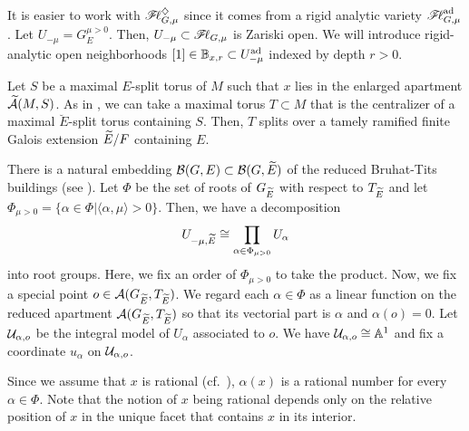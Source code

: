\documentclass[12pt,reqno]{amsart}
\begin{document}
It is easier to work with ${\mathscr{F}\!\ell}_{G, \mu}^\diamondsuit$ since it comes from a rigid analytic variety ${\mathscr{F}\!\ell}_{G, \mu}^{\operatorname{ad}}$. %
Let $U_{-\mu} = G_E^{\mu > 0}$. Then, $U_{-\mu} \subset {\mathscr{F}\!\ell}_{G, \mu}$ is Zariski open. We will introduce rigid-analytic open neighborhoods $[1] \in \mathbb{B}_{x, r} \subset U_{-\mu}^{\operatorname{ad}}$ indexed by depth $r > 0$.

Let $S$ be a maximal $E$-split torus of $M$ such that $x$ lies in the enlarged apartment ${\widetilde{{\mathcal{A}}}}(M, S)$. As in \cite[Section 2]{Yu01}, we can take a maximal torus $T \subset M$ that is the centralizer of a maximal $\breve{E}$-split torus containing $S$. Then, $T$ splits over a tamely ramified finite Galois extension ${\widetilde{E}} / F$ containing $E$. 

There is a natural embedding ${\mathcal{B}}(G, E) \subset {\mathcal{B}}(G, {\widetilde{E}})$ of the reduced Bruhat-Tits buildings (see \cite[Section 12.9]{KP23}). Let $\Phi$ be the set of roots of $G_{{\widetilde{E}}}$ with respect to $T_{{\widetilde{E}}}$ and let $\Phi_{\mu > 0} = \{ \alpha \in \Phi \vert \langle \alpha, \mu \rangle > 0 \}$. Then, we have a decomposition 
\begin{equation} \label{eq:product_description}
    U_{-\mu, {\widetilde{E}}} \cong \prod_{\alpha \in \Phi_{\mu > 0}} U_{\alpha}
\end{equation}
into root groups. Here, we fix an order of $\Phi_{\mu > 0}$ to take the product. Now, we fix a special point $o \in {\mathcal{A}}(G_{{\widetilde{E}}}, T_{{\widetilde{E}}})$. We regard each $\alpha \in \Phi$ as a linear function on the reduced apartment ${\mathcal{A}}(G_{{\widetilde{E}}}, T_{{\widetilde{E}}})$ so that its vectorial part is $\alpha$ and $\alpha(o) = 0$. Let ${\mathcal{U}}_{\alpha, o}$ be the integral model of $U_\alpha$ associated to $o$. We have ${\mathcal{U}}_{\alpha, o} \cong \mathbb{A}^1$ and fix a coordinate $u_\alpha$ on ${\mathcal{U}}_{\alpha, o}$. 

Since we assume that $x$ is rational (cf.\ \cite[Definition 13.4.1]{KP23}), $\alpha(x)$ is a rational number for every $\alpha \in \Phi$. Note that the notion of $x$ being rational depends only on the relative position of $x$ in the unique facet that contains $x$ in its interior. 

\end{document}
